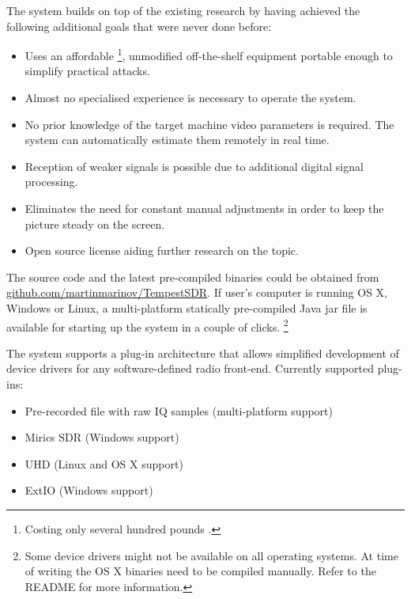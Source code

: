 \documentclass[a4paper,12pt,twoside,openright]{report}
\begin{document}
The system builds on top of the existing research by having achieved the following additional goals that were never done before:

\begin{itemize}

  \item Uses an affordable \footnote{Costing only several hundred pounds \cite{ettusb200}.}, unmodified off-the-shelf equipment portable enough to simplify practical attacks.
  \item Almost no specialised experience is necessary to operate the system.
  \item No prior knowledge of the target machine video parameters is required. The system can automatically estimate them remotely in real time.
  \item Reception of weaker signals is possible due to additional digital signal processing.
  \item Eliminates the need for constant manual adjustments in order to keep the picture steady on the screen.
  \item Open source license aiding further research on the topic.

\end{itemize}

The source code and the latest pre-compiled binaries could be obtained from \href{https://github.com/martinmarinov/TempestSDR}{github.com/martinmarinov/TempestSDR}. If user's computer is running OS X, Windows or Linux, a multi-platform statically pre-compiled Java jar file is available for starting up the system in a couple of clicks.
\footnote{Some device drivers might not be available on all operating systems. At time of writing the OS X binaries need to be compiled manually. Refer to the README for more information.}

The system supports a plug-in architecture that allows simplified development of device drivers for any software-defined radio front-end. Currently supported plug-ins:

\begin{itemize}

  \item Pre-recorded file with raw IQ samples (multi-platform support)
  \item Mirics SDR (Windows support)
  \item UHD (Linux and OS X support)
  \item ExtIO (Windows support)

\end{itemize}
\end{document}
